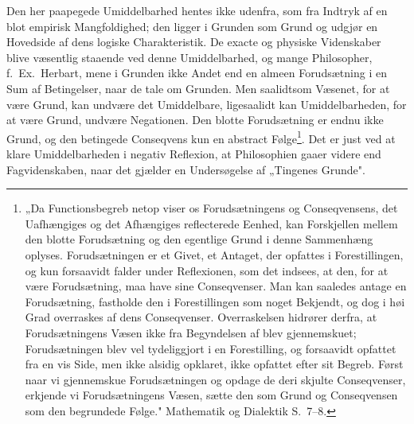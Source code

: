 \documentclass[12pt]{book}
\begin{document}
Den her paapegede Umiddelbarhed hentes ikke udenfra, som fra Indtryk af en blot
empirisk Mangfoldighed; den ligger i Grunden som Grund og udgjør en Hovedside af dens
logiske Charakteristik. De exacte og physiske Videnskaber blive væsentlig staaende
ved denne Umiddelbarhed, og mange Philosopher, f.\ Ex.\ Herbart, mene i Grunden ikke
Andet end en almeen Forudsætning i en Sum af Betingelser, naar de tale om Grunden.
Men saalidtsom Væsenet, for at være Grund, kan undvære det Umiddelbare, ligesaalidt
kan Umiddelbarheden, for at være Grund, undvære Negationen. Den blotte Forudsætning
er endnu ikke Grund, og den betingede Conseqvens kun en abstract Følge\footnote{„Da
Functionsbegreb netop viser os Forudsætningens og Conseqvensens, det Uafhængiges og
det Afhængiges reflecterede Eenhed, kan Forskjellen mellem den blotte Forudsætning og
den egentlige Grund i denne Sammenhæng oplyses. Forudsætningen er et Givet, et
Antaget, der opfattes i Forestillingen, og kun forsaavidt falder under Reflexionen,
som det indsees, at den, for at være Forudsætning, maa have sine Conseqvenser. Man
kan saaledes antage en Forudsætning, fastholde den i Forestillingen som noget
Bekjendt, og dog i høi Grad overraskes af dens Conseqvenser. Overraskelsen hidrører
derfra, at Forudsætningens Væsen ikke fra Begyndelsen af blev gjennemskuet;
Forudsætningen blev vel tydeliggjort i en Forestilling, og forsaavidt opfattet fra en
vis Side, men ikke alsidig opklaret, ikke opfattet efter sit Begreb. Først naar vi
gjennemskue Forudsætningen og opdage de deri skjulte Conseqvenser, erkjende vi
Forudsætningens Væsen, sætte den som Grund og Conseqvensen som den begrundede Følge."
Mathematik og Dialektik S.~7--8.}. Det er just ved at klare Umiddelbarheden i negativ
Reflexion, at Philosophien gaaer videre end Fagvidenskaben, naar det gjælder en
Undersøgelse af „Tingenes Grunde".
\end{document}
